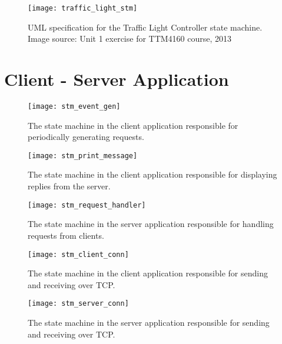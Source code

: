 \begin{appendices}
\begin{figure}[htp]
	\centering
	\texttt{[image: traffic\_light\_stm]}
	\caption[UML specification for Traffic Light Controller]{UML specification for the Traffic Light Controller state machine. Image source: Unit 1 exercise for TTM4160 course, 2013}
	\label{fig:traffic_light_uml}
\end{figure}

\FloatBarrier
\section{Client - Server Application}
\label{uml:client_server}

\begin{figure}[htp]
	\centering
	\begin{minipage}{0.45\linewidth}
		\texttt{[image: stm\_event\_gen]}
		\caption[Client \guillemotleft request-generator\guillemotright  state machine]{The state machine in the client application responsible for periodically generating requests.}
		\label{fig:stm_event_gen}
	\end{minipage}
	\quad
	\begin{minipage}{0.45\linewidth}
		\texttt{[image: stm\_print\_message]}
		\caption[Client \guillemotleft print reply\guillemotright state machine]{The state machine in the client application responsible for displaying replies from the server.}
		\label{fig:stm_print_message}
	\end{minipage}
\end{figure}

\begin{figure}[htp]
	\centering
	\texttt{[image: stm\_request\_handler]}
	\caption[Server \guillemotleft request-handler\guillemotright  state machine]{The state machine in the server application responsible for handling requests from clients.}
	\label{fig:stm_request_handler}
\end{figure}

\begin{figure}[htp]
	\centering
	\begin{minipage}{0.45\linewidth}
		\texttt{[image: stm\_client\_conn]}
		\caption[Client TCP-socket state machine]{The state machine in the client application responsible for sending and receiving over TCP.}
		\label{fig:stm_client_conn}
	\end{minipage}
	\quad
	\begin{minipage}{0.45\linewidth}
		\texttt{[image: stm\_server\_conn]}
		\caption[Server TCP-socket state machine]{The state machine in the server application responsible for sending and receiving over TCP.}
		\label{fig:stm_server_conn}
	\end{minipage}
\end{figure}

\end{appendices}